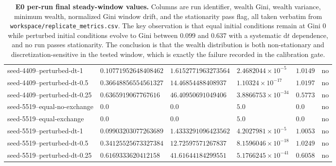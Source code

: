 \documentclass[11pt,a4paper]{article}
\newcommand{\code}[1]{\texttt{#1}}
\begin{document}
\begin{table}[htbp]
\begin{tabular}{@{}llllll@{}}
seed-4409--perturbed-dt-1 & $0.10771952648408462$ & $1.6152771963273564$ & $2.4682044\times10^{-5}$ & $1.0149$ & no \\
seed-4409--perturbed-dt-0.5 & $0.36648856554561327$ & $14.46854488408937$ & $1.10324\times10^{-17}$ & $1.0197$ & no \\
seed-4409--perturbed-dt-0.25 & $0.6365919067767616$ & $46.40950691049406$ & $3.8866753\times10^{-34}$ & $0.5773$ & no \\
seed-5519--equal-no-exchange & $0.0$ & $0.0$ & $5.0$ & $0.0$ & no \\
seed-5519--equal-exchange & $0.0$ & $0.0$ & $5.0$ & $0.0$ & no \\
seed-5519--perturbed-dt-1 & $0.09903203077263689$ & $1.4333291096423562$ & $4.2027981\times10^{-5}$ & $1.0053$ & no \\
seed-5519--perturbed-dt-0.5 & $0.34125525673327384$ & $12.72597571267837$ & $8.1596046\times10^{-18}$ & $1.0249$ & no \\
seed-5519--perturbed-dt-0.25 & $0.6169333620412158$ & $41.61644184299551$ & $5.1766245\times10^{-41}$ & $0.6058$ & no \\
\bottomrule
\end{tabular}
\caption{\textbf{E0 per-run final steady-window values.} Columns are run
identifier, wealth Gini, wealth variance, minimum wealth, normalized Gini
window drift, and the stationarity pass flag, all taken verbatim from
\code{workspace/replicate\_metrics.csv}. The key observation is that equal
initial conditions remain at Gini $0$ while perturbed initial conditions evolve
to Gini between $0.099$ and $0.637$ with a systematic $\mathrm{d}t$ dependence,
and no run passes stationarity. The conclusion is that the wealth distribution
is both non-stationary and discretization-sensitive in the tested window,
which is exactly the failure recorded in the calibration gate.}
\label{tab:e0-runs}
\end{table}
\end{document}
